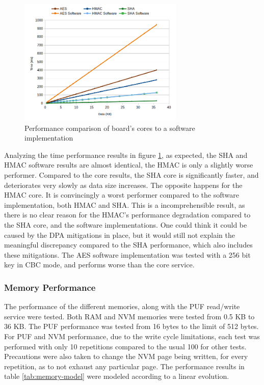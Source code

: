 \begin{figure}[h!]
	\centering
	\includegraphics[width=0.7\textwidth]{./Images/software-core-time.png}
	\caption{Performance comparison of board's cores to a software implementation}
	\label{fig:performance:software-core-time}
\end{figure}

Analyzing the time performance results in figure \ref{fig:performance:software-core-time}, as expected, the SHA and HMAC software results are almost identical, the HMAC is only a slightly worse performer. Compared to the core results, the SHA core is significantly faster, and deteriorates very slowly as data size increases. The opposite happens for the HMAC core. It is convincingly a worst performer compared to the software implementation, both HMAC and SHA. 
This is a incomprehensible result, as there is no clear reason for the HMAC's performance degradation compared to the SHA core, and the software implementations. One could think it could be caused by the \ac{DPA} mitigations in place, but it would still not explain the meaningful discrepancy compared to the SHA performance, which also includes these mitigations.
The AES software implementation was tested with a 256 bit key in CBC mode, and performs worse than the core service.

\subsubsection{Memory Performance}\label{chap:evaluation:services:memory}

The performance of the different memories, along with the PUF read/write service were tested. Both RAM and NVM memories were tested from 0.5 KB to 36 KB. The PUF performance was tested from 16 bytes to the limit of 512 bytes. For PUF and NVM performance, due to the write cycle limitations, each test was performed with only 10 repetitions compared to the usual 100 for other tests. Precautions were also taken to change the NVM page being written, for every repetition, as to not exhaust any particular page.
The performance results in table \ref{tab:memory-model} were modeled according to a linear evolution.

